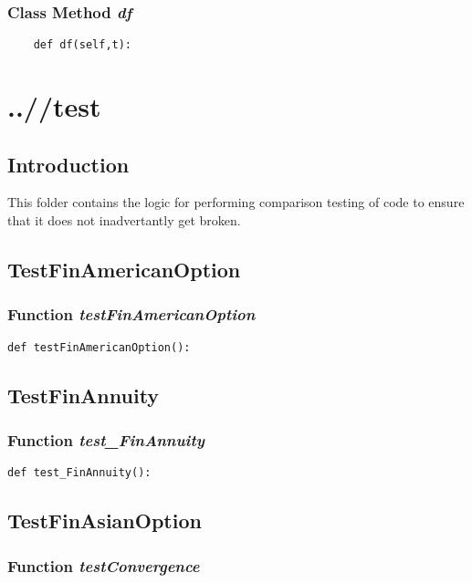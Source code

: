 \documentclass[twoside,11pt]{book}
\begin{document}
\subsection{Class Method {\it df}}


\begin{lstlisting}
    def df(self,t):
\end{lstlisting}


\chapter{..//test}
\section{Introduction}
This folder contains the logic for performing comparison testing of code to ensure that it does not inadvertantly get broken. 

\newpage
\section{TestFinAmericanOption}

\subsection{Function {\it testFinAmericanOption}}


\begin{lstlisting}
def testFinAmericanOption():
\end{lstlisting}


\newpage
\section{TestFinAnnuity}

\subsection{Function {\it test\_FinAnnuity}}


\begin{lstlisting}
def test_FinAnnuity():
\end{lstlisting}


\newpage
\section{TestFinAsianOption}

\subsection{Function {\it testConvergence}}
\end{document}
